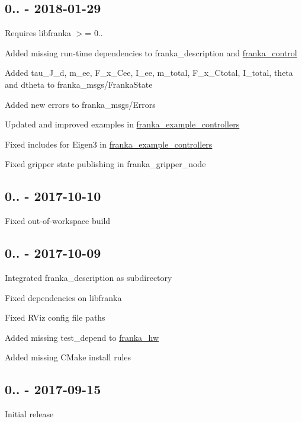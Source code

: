\subsection*{0.. -\/ 2018-\/01-\/29}

Requires {\ttfamily libfranka} $>$= 0..


\begin{DoxyItemize}
\item Added missing run-\/time dependencies to {\ttfamily franka\+\_\+description} and {\ttfamily \hyperlink{namespacefranka__control}{franka\+\_\+control}}
\item Added {\ttfamily tau\+\_\+\+J\+\_\+d}, {\ttfamily m\+\_\+ee}, {\ttfamily F\+\_\+x\+\_\+\+Cee}, {\ttfamily I\+\_\+ee}, {\ttfamily m\+\_\+total}, {\ttfamily F\+\_\+x\+\_\+\+Ctotal}, {\ttfamily I\+\_\+total}, {\ttfamily theta} and {\ttfamily dtheta} to {\ttfamily franka\+\_\+msgs/\+Franka\+State}
\item Added new errors to {\ttfamily franka\+\_\+msgs/\+Errors}
\item Updated and improved examples in {\ttfamily \hyperlink{namespacefranka__example__controllers}{franka\+\_\+example\+\_\+controllers}}
\item Fixed includes for Eigen3 in {\ttfamily \hyperlink{namespacefranka__example__controllers}{franka\+\_\+example\+\_\+controllers}}
\item Fixed gripper state publishing in {\ttfamily franka\+\_\+gripper\+\_\+node}
\end{DoxyItemize}

\subsection*{0.. -\/ 2017-\/10-\/10}


\begin{DoxyItemize}
\item Fixed out-\/of-\/workspace build
\end{DoxyItemize}

\subsection*{0.. -\/ 2017-\/10-\/09}


\begin{DoxyItemize}
\item Integrated {\ttfamily franka\+\_\+description} as subdirectory
\item Fixed dependencies on libfranka
\item Fixed R\+Viz config file paths
\item Added missing {\ttfamily test\+\_\+depend} to {\ttfamily \hyperlink{namespacefranka__hw}{franka\+\_\+hw}}
\item Added missing C\+Make install rules
\end{DoxyItemize}

\subsection*{0.. -\/ 2017-\/09-\/15}


\begin{DoxyItemize}
\item Initial release 
\end{DoxyItemize}